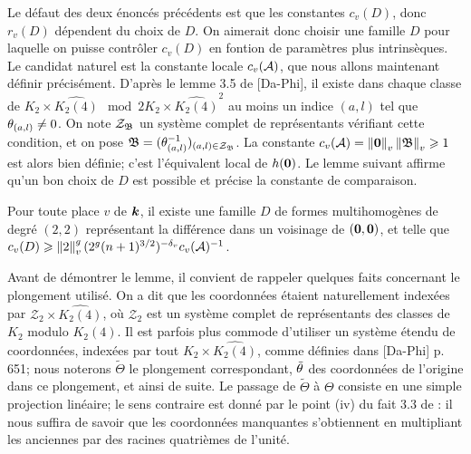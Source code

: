 Le défaut des deux énoncés précédents est que les constantes $c_v(D)$, donc $r_v(D)$ dépendent  du choix de $D$. On aimerait donc choisir une famille $D$ pour laquelle on puisse contrôler $c_v(D)$ en fontion de paramètres plus intrinsèques. Le candidat naturel est la constante locale $c_v(\mathcal{A})$, que nous allons maintenant définir précisément. D'après le lemme 3.5 de [Da-Phi], il existe dans chaque classe de $K_2 \times \widehat{K_2(4)} \mod 2K_2 \times \widehat{K_2(4)}^2$ au moins un indice $(a, l)$ tel que $\theta_{(a,l)} \neq 0$. On note $\mathcal{Z}_{\mathfrak{B}}$ un système complet de représentants vérifiant cette condition, et on pose $\mathfrak{B} = (\theta_{(a, l)}^{-1})_{(a, l) \in \mathcal{Z}_{\mathfrak{B}}}$. La constante $c_v(\mathcal{A}) = \left\lVert{\boldsymbol{0}}\right\rVert_{v}\left\lVert\mathfrak{B}\right\rVert_{v} \geqslant 1$ est alors bien définie; c'est l'équivalent local de $h({\boldsymbol{0}})$. Le lemme suivant affirme qu'un bon choix de $D$ est possible et précise la constante de comparaison.

\begin{lem} \label{RayonAbs}
Pour toute place $v$ de $\boldsymbol{k}$, il existe une famille $D$ de formes multihomogènes de degré $(2, 2)$ représentant la différence dans un voisinage de $({\boldsymbol{0}}, {\boldsymbol{0}})$, et telle que $c_v(D) \geqslant \left\lVert2\right\rVert_{v}^g(2^g(n+1)^{3/2})^{-{\delta_v}} c_v(\mathcal{A})^{-1}$.
\end{lem}

Avant de démontrer le lemme, il convient de rappeler quelques faits concernant le plongement utilisé. On a dit que les coordonnées étaient naturellement indexées par $\mathcal{Z}_2 \times \widehat{K_2(4)}$, où $\mathcal{Z}_2$ est un système complet de représentants des classes de $K_2$ modulo $K_2(4)$. Il est parfois plus commode d'utiliser un système étendu de coordonnées, indexées par tout $K_2 \times \widehat{K_2(4)}$, comme définies dans [Da-Phi] p. 651; nous noterons $\tilde{\Theta}$ le plongement correspondant, $\tilde{\theta}$ des coordonnées de l'origine dans ce plongement, et ainsi de suite. Le passage de $\tilde{\Theta}$ à $\Theta$ consiste en une simple projection linéaire; le sens contraire est donné par le point (iv) du fait 3.3 de  : il nous suffira de savoir que les coordonnées manquantes s'obtiennent en multipliant les anciennes par des racines quatrièmes de l'unité.


